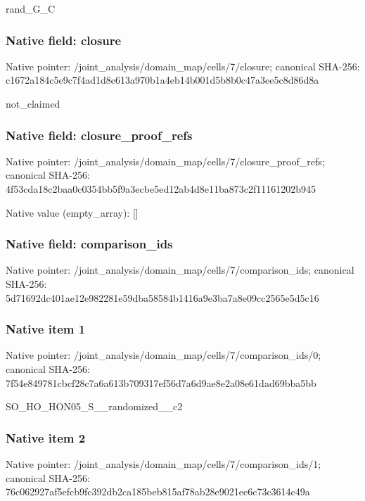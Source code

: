 \documentclass[10pt,a4paper]{article}
\begin{document}
\begingroup\raggedright\sloppy rand\_\allowbreak{}G\_\allowbreak{}C\par\endgroup

\subsubsection{Native field: closure}
Native pointer: /joint\_\allowbreak{}analysis/domain\_\allowbreak{}map/cells/7/closure; canonical SHA-256: c1672a184c5e9c7f4ad1d8e613a970b1a4eb14b001d5b8b0c47a3ee5c8d86d8a

\begingroup\raggedright\sloppy not\_\allowbreak{}claimed\par\endgroup

\subsubsection{Native field: closure\_\allowbreak{}proof\_\allowbreak{}refs}
Native pointer: /joint\_\allowbreak{}analysis/domain\_\allowbreak{}map/cells/7/closure\_\allowbreak{}proof\_\allowbreak{}refs; canonical SHA-256: 4f53cda18c2baa0c0354bb5f9a3ecbe5ed12ab4d8e11ba873c2f11161202b945

Native value (empty\_\allowbreak{}array): []

\subsubsection{Native field: comparison\_\allowbreak{}ids}
Native pointer: /joint\_\allowbreak{}analysis/domain\_\allowbreak{}map/cells/7/comparison\_\allowbreak{}ids; canonical SHA-256: 5d71692dc401ae12e982281e59dba58584b1416a9e3ba7a8e09cc2565e5d5c16

\subsubsection{Native item 1}
Native pointer: /joint\_\allowbreak{}analysis/domain\_\allowbreak{}map/cells/7/comparison\_\allowbreak{}ids/0; canonical SHA-256: 7f54e849781cbcf28c7a6a613b709317ef56d7a6d9ae8e2a08e61dad69bba5bb

\begingroup\raggedright\sloppy SO\_\allowbreak{}HO\_\allowbreak{}HON05\_\allowbreak{}S\_\allowbreak{}\_\allowbreak{}randomized\_\allowbreak{}\_\allowbreak{}c2\par\endgroup

\subsubsection{Native item 2}
Native pointer: /joint\_\allowbreak{}analysis/domain\_\allowbreak{}map/cells/7/comparison\_\allowbreak{}ids/1; canonical SHA-256: 76c062927af5efcb9fc392db2ca185beb815af78ab28e9021ee6c73c3614c49a
\end{document}
